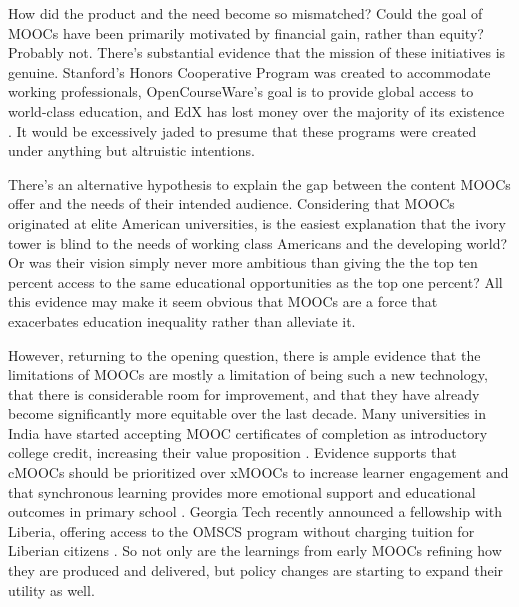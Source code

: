 \documentclass[
	letterpaper, %
]{jdf}
\begin{document}
How did the product and the need become so mismatched? Could the goal of MOOCs have been primarily motivated by financial gain, rather than equity? Probably not. There's substantial evidence that the mission of these initiatives is genuine. Stanford's Honors Cooperative Program was created to accommodate working professionals, OpenCourseWare's goal is to provide global access to world-class education, and EdX has lost money over the majority of its existence . It would be excessively jaded to presume that these programs were created under anything but altruistic intentions. 

There's an alternative hypothesis to explain the gap between the content MOOCs offer and the needs of their intended audience. Considering that MOOCs originated at elite American universities, is the easiest explanation that the ivory tower is blind to the needs of working class Americans and the developing world? Or was their vision simply never more ambitious than giving the the top ten percent access to the same educational opportunities as the top one percent? All this evidence may make it seem obvious that MOOCs are a force that exacerbates education inequality rather than alleviate it.

However, returning to the opening question, there is ample evidence that the limitations of MOOCs are mostly a limitation of being such a new technology, that there is considerable room for improvement, and that they have already become significantly more equitable over the last decade. Many universities in India have started accepting MOOC certificates of completion as introductory college credit, increasing their value proposition . Evidence supports that cMOOCs should be prioritized over xMOOCs to increase learner engagement and that synchronous learning provides more emotional support and educational outcomes in primary school . Georgia Tech recently announced a fellowship with Liberia, offering access to the OMSCS program without charging tuition for Liberian citizens . So not only are the learnings from early MOOCs refining how they are produced and delivered, but policy changes are starting to expand their utility as well.
\end{document}
